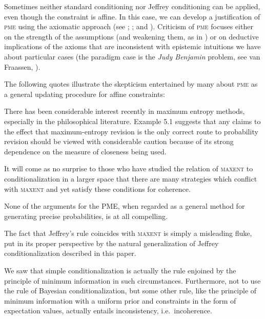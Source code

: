 \documentclass[phd,12pt,oneside]{ubcthesis}
\begin{document}
Sometimes neither standard conditioning nor Jeffrey conditioning can
be applied, even though the constraint is affine. In this case, we can
develop a justification of \textsc{pme} using the axiomatic approach
(see ; ; and
). Criticism of \textsc{pme} focuses either on
the strength of the assumptions (and weakening them, as in
) or on deductive implications of the axioms that
are inconsistent with epistemic intuitions we have about particular
cases (the paradigm case is the \emph{Judy Benjamin} problem, see van
Fraassen, ). 

The following quotes illustrate the skepticism entertained by many
about \textsc{pme} as a general updating procedure for affine
constraints:

\begin{quotex}
  There has been considerable interest recently in maximum entropy
  methods, especially in the philosophical literature. Example 5.1
  suggests that any claims to the effect that maximum-entropy revision
  is the only correct route to probability revision should be viewed
  with considerable caution because of its strong dependence on the
  measure of closeness being used. 
\end{quotex}

\begin{quotex}
  It will come as no surprise to those who have studied the relation
  of \textsc{maxent} to conditionalization in a larger space that
  there are many strategies which conflict with \textsc{maxent} and
  yet satisfy these conditions for coherence. 
\end{quotex}

\begin{quotex}
  None of the arguments for the PME, when regarded as a general method
  for generating precise probabilities, is at all compelling.
\end{quotex}

\begin{quotex}
  The fact that Jeffrey's rule coincides with \textsc{maxent} is
  simply a misleading fluke, put in its proper perspective by the
  natural generalization of Jeffrey conditionalization described in
  this paper. 
\end{quotex}

\begin{quotex}
  We saw that simple conditionalization is actually the rule enjoined
  by the principle of minimum information in such circumstances.
  Furthermore, not to use the rule of Bayesian conditionalization, but
  some other rule, like the principle of minimum information with a
  uniform prior and constraints in the form of expectation values,
  actually entails inconsistency, i.e.\ incoherence.
\end{quotex}
\end{document}
